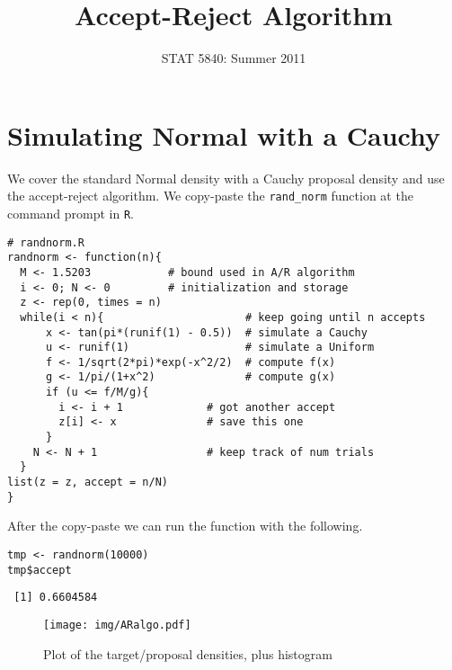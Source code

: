 \documentclass[11pt,english]{article}
\title{Accept-Reject Algorithm}
\date{STAT 5840: Summer 2011}
\begin{document}
\maketitle

\thispagestyle{empty}

\section*{Simulating Normal with a Cauchy}
\label{sec-1}

We cover the standard Normal density with a Cauchy proposal density and use the accept-reject algorithm.  We copy-paste the \texttt{rand\_norm} function at the command prompt in \texttt{R}.


\begin{verbatim}
# randnorm.R
randnorm <- function(n){
  M <- 1.5203            # bound used in A/R algorithm
  i <- 0; N <- 0         # initialization and storage
  z <- rep(0, times = n)
  while(i < n){                      # keep going until n accepts
      x <- tan(pi*(runif(1) - 0.5))  # simulate a Cauchy
      u <- runif(1)                  # simulate a Uniform
      f <- 1/sqrt(2*pi)*exp(-x^2/2)  # compute f(x)
      g <- 1/pi/(1+x^2)              # compute g(x)
      if (u <= f/M/g){
        i <- i + 1             # got another accept
        z[i] <- x              # save this one
      }
    N <- N + 1                 # keep track of num trials
  }
list(z = z, accept = n/N)                     
}
\end{verbatim}



After the copy-paste we can run the function with the following.

\begin{verbatim}
tmp <- randnorm(10000)
tmp$accept
\end{verbatim}




\begin{verbatim}
 [1] 0.6604584
\end{verbatim}




\begin{figure}[h!]
\centering
\texttt{[image: img/ARalgo.pdf]}
\caption{\label{fig:yplot}Plot of the target/proposal densities, plus histogram}
\end{figure}
\end{document}
